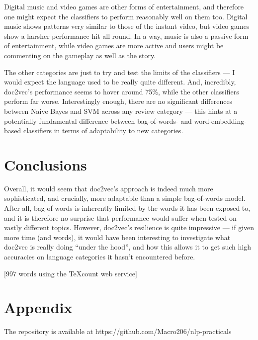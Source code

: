 \documentclass[12pt,a4paper,twoside]{article}
\begin{document}
Digital music and video games are other forms of entertainment, and therefore one might expect the classifiers to perform reasonably well on them too. Digital music shows patterns very similar to those of the instant video, but video games show a harsher performance hit all round. In a way, music is also a passive form of entertainment, while video games are more active and users might be commenting on the gameplay as well as the story.

The other categories are just to try and test the limits of the classifiers --- I would expect the language used to be really quite different. And, incredibly, doc2vec's performance seems to hover around 75\%, while the other classifiers perform far worse. Interestingly enough, there are no significant differences between Naive Bayes and SVM across any review category --- this hints at a potentially fundamental difference between bag-of-words- and word-embedding-based classifiers in terms of adaptability to new categories.


\section{Conclusions}

Overall, it would seem that doc2vec's approach is indeed much more sophisticated, and crucially, more adaptable than a simple bag-of-words model. After all, bag-of-words is inherently limited by the words it has been exposed to, and it is therefore no surprise that performance would suffer when tested on vastly different topics. However, doc2vec's resilience is quite impressive --- if given more time (and words), it would have been interesting to investigate what doc2vec is really doing ``under the hood'', and how this allows it to get such high accuracies on language categories it hasn't encountered before.

\vspace{16px}

[997 words using the TeXcount web service]

\section{Appendix}

The repository is available at https://github.com/Macro206/nlp-practicals
\end{document}
